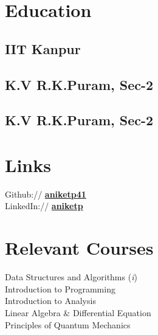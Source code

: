 \documentclass[]{deedy-resume-openfont}
\begin{document}
\begin{minipage}[t]{0.33\textwidth} 


\section{Education} 

\subsection{IIT Kanpur}
\sectionsep{}

\subsection{K.V R.K.Puram, Sec-2}
\sectionsep{}

\subsection{K.V R.K.Puram, Sec-2}


\section{Links} 
Github:// \href{https://github.com/aniketp41}{\bf aniketp41} \\
LinkedIn://  \href{https://www.linkedin.com/in/aniket-pandey-001a0613b}{\bf aniketp} \\



\section{Relevant Courses}
Data Structures and Algorithms (\textit{i}) \\
Introduction to Programming \\
Introduction to Analysis \\
Linear Algebra \& Differential Equation \\
Principles of Quantum Mechanics \\ 


\end{minipage}
\end{document}
